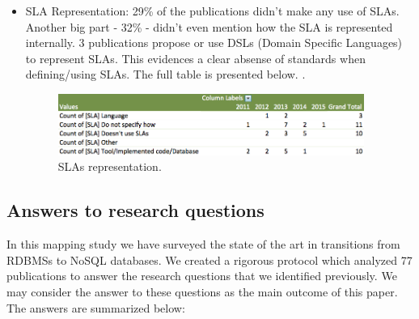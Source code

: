 \documentclass{article}
\begin{document}
\begin{itemize}
\item{SLA Representation: }
29\% of the publications didn't make any use of SLAs. Another big part - 32\% - didn't even mention how the SLA is represented internally. 3 publications propose or use DSLs (Domain Specific Languages) to represent SLAs. This evidences a clear absense of standards when defining/using SLAs. The full table is presented below.  \cite{fullDBJson}.
\begin{figure}[htb!]
\centering
\includegraphics[width=100mm]{graph4.png}
\caption{SLAs representation.}
\end{figure}



\end{itemize}


\newpage

\subsection{Answers to research questions}

In this mapping study we have surveyed the state of the art in transitions from RDBMSs to NoSQL databases. We created a rigorous protocol which analyzed 77 publications to answer the research questions that we identified previously. We may consider the answer to these questions as the main outcome of this paper. The answers are summarized below:
\\
\end{document}
